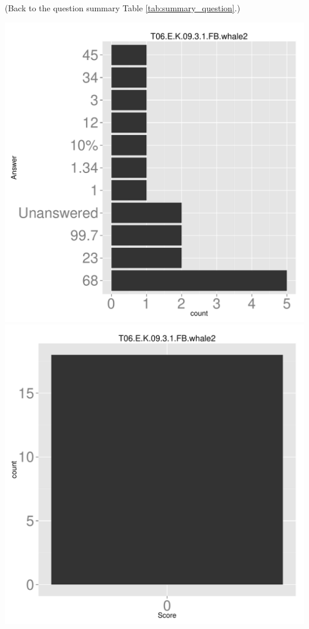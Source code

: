 \documentclass[12pt,english,nohyper]{tufte-handout}\usepackage[]{graphicx}\usepackage[]{color}
\begin{document}
 (Back to the question summary Table \ref{tab:summary_question}.)

\begin{center} \includegraphics[width=.45\linewidth]{Topic06_AB_28_answer} \includegraphics[width=.45\linewidth]{Topic06_AB_28_score} \end{center} 
\end{document}
